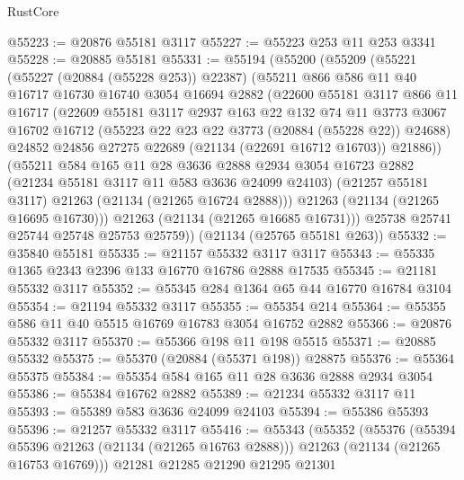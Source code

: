 \begin{lexlean}{RustCore}
\begin{coremodule}
@55223 := @20876 @55181 @3117
@55227 := @55223 @253 @11 @253 @3341
@55228 := @20885 @55181
@55331 := @55194
    (@55200
      (@55209
        (@55221
          (@55227 (@20884 (@55228 @253)) @22387)
          (@55211
            @866
            @586
            @11
            @40
            @16717
            @16730
            @16740
            @3054
            @16694
            @2882
            (@22600
              @55181
              @3117
              @866
              @11
              @16717
              (@22609
                @55181
                @3117
                @2937
                @163
                @22
                @132
                @74
                @11
                @3773
                @3067
                @16702
                @16712
                (@55223 @22 @23 @22 @3773 (@20884 (@55228 @22)) @24688)
                @24852
                @24856
                @27275
                @22689
                (@21134 (@22691 @16712 @16703))
                @21886))
            (@55211
              @584
              @165
              @11
              @28
              @3636
              @2888
              @2934
              @3054
              @16723
              @2882
              (@21234 @55181 @3117 @11 @583 @3636 @24099 @24103)
              (@21257 @55181 @3117)
              @21263
              (@21134 (@21265 @16724 @2888)))
            @21263
            (@21134 (@21265 @16695 @16730)))
          @21263
          (@21134 (@21265 @16685 @16731)))
        @25738
        @25741
        @25744
        @25748
        @25753
        @25759))
    (@21134 (@25765 @55181 @263))
@55332 := @35840 @55181
@55335 := @21157 @55332 @3117 @3117
@55343 := @55335 @1365 @2343 @2396 @133 @16770 @16786 @2888 @17535
@55345 := @21181 @55332 @3117
@55352 := @55345 @284 @1364 @65 @44 @16770 @16784 @3104
@55354 := @21194 @55332 @3117
@55355 := @55354 @214
@55364 := @55355 @586 @11 @40 @5515 @16769 @16783 @3054 @16752 @2882
@55366 := @20876 @55332 @3117
@55370 := @55366 @198 @11 @198 @5515
@55371 := @20885 @55332
@55375 := @55370 (@20884 (@55371 @198)) @28875
@55376 := @55364 @55375
@55384 := @55354 @584 @165 @11 @28 @3636 @2888 @2934 @3054
@55386 := @55384 @16762 @2882
@55389 := @21234 @55332 @3117 @11
@55393 := @55389 @583 @3636 @24099 @24103
@55394 := @55386 @55393
@55396 := @21257 @55332 @3117
@55416 := @55343
    (@55352
      (@55376
        (@55394 @55396 @21263 (@21134 (@21265 @16763 @2888)))
        @21263
        (@21134 (@21265 @16753 @16769)))
      @21281
      @21285
      @21290
      @21295
      @21301

\end{coremodule}
\end{lexlean}
